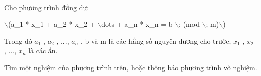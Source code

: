  

Cho phương trình đồng dư:

$\backslash$(a\_1 * x\_1 + a\_2 * x\_2 + $\backslash$dots + a\_n * x\_n = b $\backslash$; (mod $\backslash$; m)$\backslash$)

Trong đó $a_{1}$ , $a_{2}$ , ..., $a_{n}$ , b và m là các hằng số nguyên dương cho trước; $x_{1}$ , $x_{2}$ , ..., $x_{n}$ là các ẩn.

Tìm một nghiệm của phương trình trên, hoặc thông báo phương trình vô nghiệm.